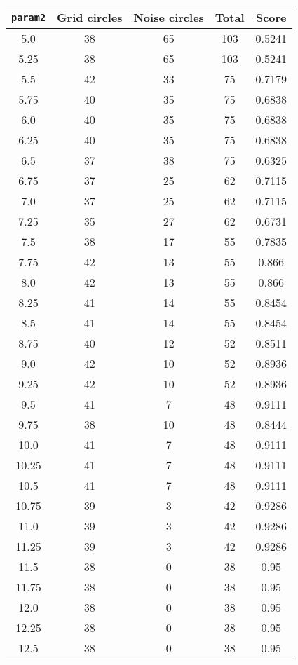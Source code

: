 \documentclass[letterpaper, 12pt]{article}
\begin{document}
\begin{longtable}{|c|c|c|c|c|}
\hline
\textbf{\texttt{param2}} & \textbf{Grid circles} & \textbf{Noise circles} & \textbf{Total} & \textbf{Score} \\
\hline
5.0 & 38 & 65 & 103 & 0.5241 \\
\hline
5.25 & 38 & 65 & 103 & 0.5241 \\
\hline
5.5 & 42 & 33 & 75 & 0.7179 \\
\hline
5.75 & 40 & 35 & 75 & 0.6838 \\
\hline
6.0 & 40 & 35 & 75 & 0.6838 \\
\hline
6.25 & 40 & 35 & 75 & 0.6838 \\
\hline
6.5 & 37 & 38 & 75 & 0.6325 \\
\hline
6.75 & 37 & 25 & 62 & 0.7115 \\
\hline
7.0 & 37 & 25 & 62 & 0.7115 \\
\hline
7.25 & 35 & 27 & 62 & 0.6731 \\
\hline
7.5 & 38 & 17 & 55 & 0.7835 \\
\hline
7.75 & 42 & 13 & 55 & 0.866 \\
\hline
8.0 & 42 & 13 & 55 & 0.866 \\
\hline
8.25 & 41 & 14 & 55 & 0.8454 \\
\hline
8.5 & 41 & 14 & 55 & 0.8454 \\
\hline
8.75 & 40 & 12 & 52 & 0.8511 \\
\hline
9.0 & 42 & 10 & 52 & 0.8936 \\
\hline
9.25 & 42 & 10 & 52 & 0.8936 \\
\hline
9.5 & 41 & 7 & 48 & 0.9111 \\
\hline
9.75 & 38 & 10 & 48 & 0.8444 \\
\hline
10.0 & 41 & 7 & 48 & 0.9111 \\
\hline
10.25 & 41 & 7 & 48 & 0.9111 \\
\hline
10.5 & 41 & 7 & 48 & 0.9111 \\
\hline
10.75 & 39 & 3 & 42 & 0.9286 \\
\hline
11.0 & 39 & 3 & 42 & 0.9286 \\
\hline
11.25 & 39 & 3 & 42 & 0.9286 \\
\hline
11.5 & 38 & 0 & 38 & 0.95 \\
\hline
11.75 & 38 & 0 & 38 & 0.95 \\
\hline
12.0 & 38 & 0 & 38 & 0.95 \\
\hline
12.25 & 38 & 0 & 38 & 0.95 \\
\hline
12.5 & 38 & 0 & 38 & 0.95 \\

\end{longtable}
\end{document}
